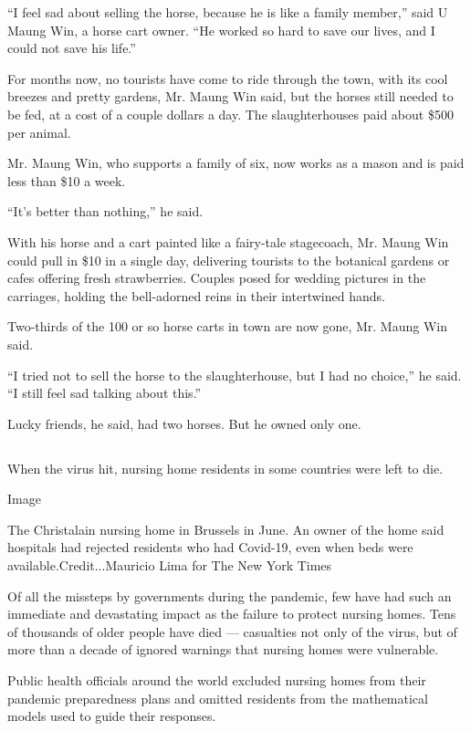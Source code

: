 ``I feel sad about selling the horse, because he is like a family
member,'' said U Maung Win, a horse cart owner. ``He worked so hard to
save our lives, and I could not save his life.''

For months now, no tourists have come to ride through the town, with its
cool breezes and pretty gardens, Mr. Maung Win said, but the horses
still needed to be fed, at a cost of a couple dollars a day. The
slaughterhouses paid about \$500 per animal.

Mr. Maung Win, who supports a family of six, now works as a mason and is
paid less than \$10 a week.

``It's better than nothing,'' he said.

With his horse and a cart painted like a fairy-tale stagecoach, Mr.
Maung Win could pull in \$10 in a single day, delivering tourists to the
botanical gardens or cafes offering fresh strawberries. Couples posed
for wedding pictures in the carriages, holding the bell-adorned reins in
their intertwined hands.

Two-thirds of the 100 or so horse carts in town are now gone, Mr. Maung
Win said.

``I tried not to sell the horse to the slaughterhouse, but I had no
choice,'' he said. ``I still feel sad talking about this.''

Lucky friends, he said, had two horses. But he owned only one.

\hypertarget{section-11}{%
\subsection{}\label{section-11}}

When the virus hit, nursing home residents in some countries were left
to die.

Image

The Christalain nursing home in Brussels in June. An owner of the home
said hospitals had rejected residents who had Covid-19, even when beds
were available.Credit...Mauricio Lima for The New York Times

Of all the missteps by governments during the pandemic, few have had
such an immediate and devastating impact as the failure to protect
nursing homes. Tens of thousands of older people have died ---
casualties not only of the virus, but of more than a decade of ignored
warnings that nursing homes were vulnerable.

Public health officials around the world excluded nursing homes from
their pandemic preparedness plans and omitted residents from the
mathematical models used to guide their responses.

